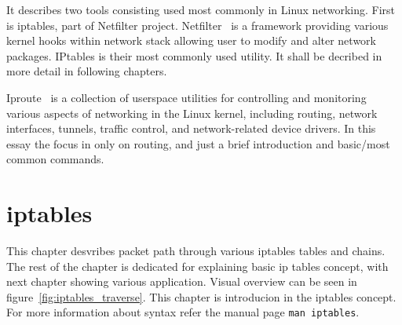 \documentclass[times, utf8, seminar, english]{fer}
\begin{document}
It describes two tools consisting used most commonly in Linux networking. First is iptables, part of Netfilter project. Netfilter~\cite{netfilte6:online} is a framework providing various kernel hooks within network stack allowing user to modify and alter network packages. IPtables is their most commonly used utility. It shall be decribed in more detail in following chapters.

Iproute~\cite{shemming47:online} is a collection of userspace utilities for controlling and monitoring various aspects of networking in the Linux kernel, including routing, network interfaces, tunnels, traffic control, and network-related device drivers. In this essay the focus in only on routing, and just a brief introduction and basic/most common commands.

\chapter{iptables}
This chapter desvribes packet path through various iptables tables and chains. The rest of the chapter is dedicated for explaining basic ip tables concept, with next chapter showing various application.
Visual overview can be seen in figure~\ref{fig:iptables_traverse}. This chapter is introducion in the iptables concept. For more information about syntax refer the manual page \verb|man iptables|.
\end{document}

